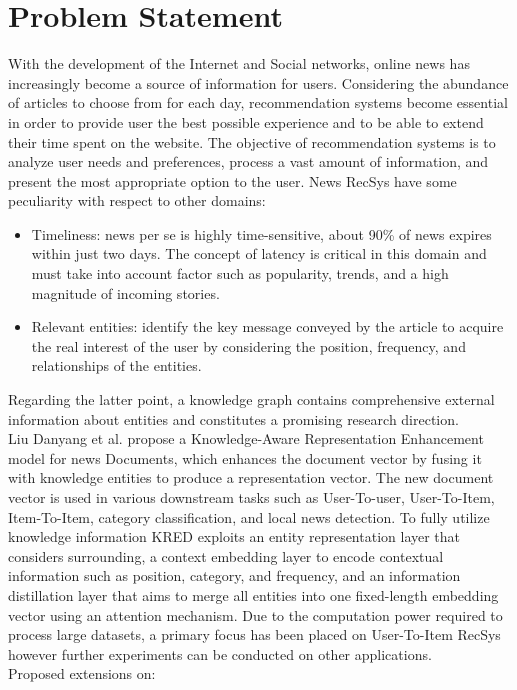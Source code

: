 \documentclass[conference]{IEEEtran}
\begin{document}
\section{Problem Statement}
With the development of the Internet and Social networks, online news has increasingly become a source of information for users. Considering the abundance of articles to choose from for each day, recommendation systems become essential in order to provide user the best possible experience and to be able to extend their time spent on the website\cite{ijcai2018p529}.
The objective of recommendation systems is to analyze user needs and preferences, process a vast amount of information, and present the most appropriate option to the user.
News RecSys have some peculiarity with respect to other domains:
\begin{itemize}
    \item Timeliness: news per se is highly time-sensitive, about 90\% of news expires within just two days. The concept of latency is critical in this domain and must take into account factor such as popularity, trends, and a high magnitude of incoming stories.
    \item  Relevant entities: identify the key message conveyed by the article to acquire the real interest of the user by considering the position, frequency, and relationships of the entities.
\end{itemize}
Regarding the latter point, a knowledge graph contains comprehensive external information about entities and constitutes a promising research direction.\\
Liu Danyang et al. propose a Knowledge-Aware Representation Enhancement model for news Documents, which enhances the document vector by fusing it with knowledge entities to produce a  representation vector. The new document vector is used in various downstream tasks such as User-To-user, User-To-Item, Item-To-Item, category classification, and local news detection.
To fully utilize knowledge information KRED exploits an entity representation layer that considers surrounding, a context embedding layer to encode contextual information such as position, category, and frequency, and an information distillation layer that aims to merge all entities into one fixed-length embedding vector using an attention mechanism.
Due to the computation power required to process large datasets, a primary focus has been placed on User-To-Item RecSys however further experiments can be conducted on other applications. \\
Proposed extensions on:
\end{document}
